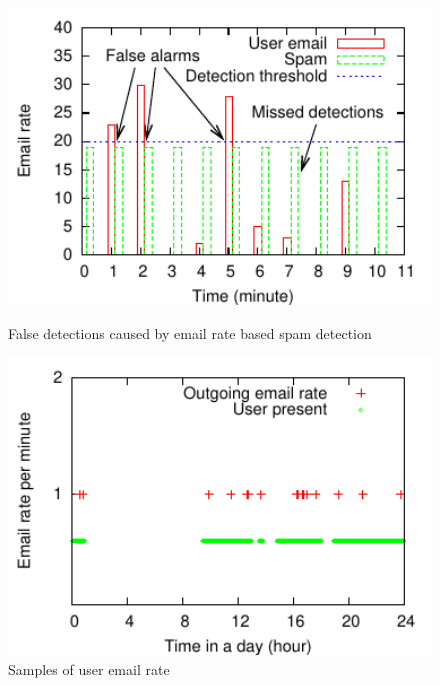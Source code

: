 \begin{figure}[tb]
\begin{center}
\begin{minipage}[t]{.49\textwidth}
     \includegraphics[width=1\textwidth]{sensor/email}
\vspace*{-4mm}
\caption{False detections caused by email rate based
spam detection}
\label{fig:detect-by-rate}
\end{minipage}
\begin{minipage}[t]{.5\textwidth}
\includegraphics[width=1\textwidth]{sensor/email-norm}
\vspace*{-4mm}
\caption{Samples of user email rate}
\label{fig:email}
\end{minipage}
\end{center}
\end{figure}

